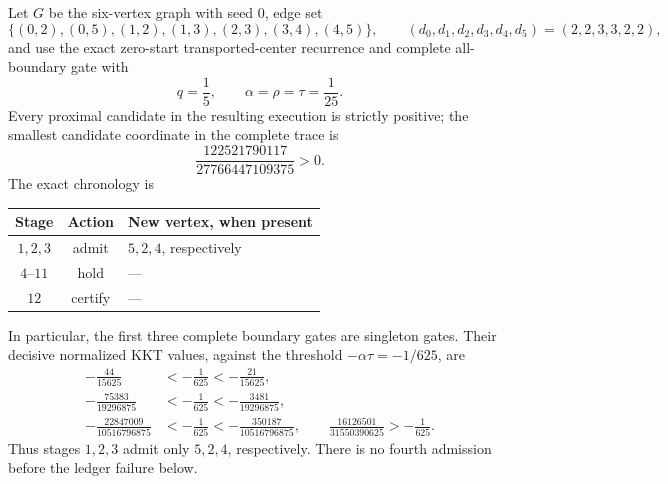 \begin{proposition}
\label{prop:three-admission-all-history-stop}
Let $G$ be the six-vertex graph with seed $0$, edge set
\begin{equation}
 \{(0,2),(0,5),(1,2),(1,3),(2,3),(3,4),(4,5)\},
 \qquad
 (d_0,d_1,d_2,d_3,d_4,d_5)=(2,2,3,3,2,2),
 \label{eq:three-admission-witness}
\end{equation}
and use the exact zero-start transported-center recurrence and complete
all-boundary gate with
\[
 q=\frac15,
 \qquad
 \alpha=\rho=\tau=\frac1{25}.
\]
Every proximal candidate in the resulting execution is strictly positive;
the smallest candidate coordinate in the complete trace is
\begin{equation}
 \frac{122521790117}{27766447109375}>0.
 \label{eq:three-admission-positive-margin}
\end{equation}
The exact chronology is
\begin{center}
\small
\begin{tabular}{@{}ccl@{}}
\toprule
Stage & Action & New vertex, when present \\
\midrule
$1,2,3$ & admit & $5,2,4$, respectively \\
$4$--$11$ & hold & --- \\
$12$ & certify & --- \\
\bottomrule
\end{tabular}
\end{center}
In particular, the first three complete boundary gates are singleton gates.
Their decisive normalized KKT values, against the threshold
$-\alpha\tau=-1/625$, are
\begin{align}
 -\frac{44}{15625}
 &< -\frac1{625}< -\frac{21}{15625},
 \label{eq:three-admission-gate-one}\\
 -\frac{75383}{19296875}
 &< -\frac1{625}< -\frac{3481}{19296875},
 \label{eq:three-admission-gate-two}\\
 -\frac{22847009}{10516796875}
 &< -\frac1{625}
 < -\frac{350187}{10516796875},
 \qquad
 \frac{16126501}{31550390625}>-\frac1{625}.
 \label{eq:three-admission-gate-three}
\end{align}
Thus stages $1,2,3$ admit only $5,2,4$, respectively.  There is no fourth
admission before the ledger failure below.


\end{proposition}

